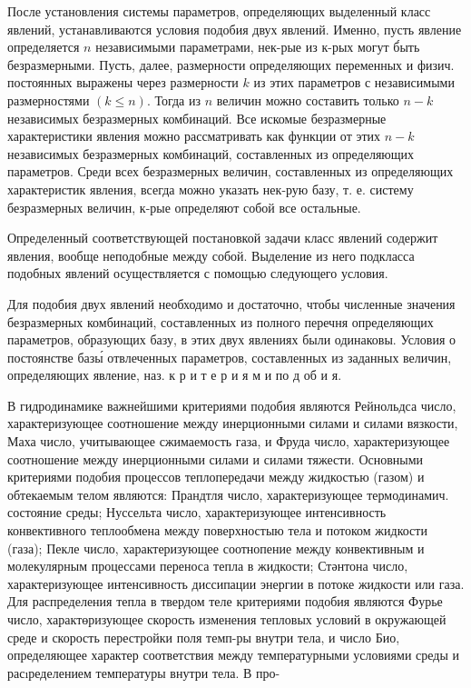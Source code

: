 \documentclass[10pt]{article}
\begin{document}
После установления системы параметров, определяющих выделенный класс явлений, устанавливаются условия подобия двух явлений. Именно, пусть явление определяется $n$ независимыми параметрами, нек-рые из к-рых могут б́ыть безразмерными. Пусть, далее, размерности определяющих переменных и физич. постоянных выражены через размерности $k$ из этих параметров с независимыми размерностями $(k \leqslant n)$. Тогда из $n$ величин можно составить только $n-k$ независимых безразмерных комбинаций. Все искомые безразмерные характеристики явления можно рассматривать как функции от этих $n-k$ независимых безразмерных комбинаций, составленных из определяющих параметров. Среди всех безразмерных величин, составленных из определяющих характеристик явления, всегда можно указать нек-рую базу, т. е. систему безразмерных величин, к-рые определяют собой все остальные.



Определенный соответствующей постановкой задачи класс явлений содержит явления, вообще неподобные между собой. Выделение из него подкласса подобных явлений осуществляется с помощью следующего условия.



Для подобия двух явлений необходимо и достаточно, чтобы численные значения безразмерных комбинаций, составленных из полного перечня определяющих параметров, образующих базу, в этих двух явлениях были одинаковы. Условия о постоянстве базы́ отвлеченных параметров, составленных из заданных величин, определяющих явление, наз. к р и т е р и я м и по д об и я.



В гидродинамике важнейшими критериями подобия являются Рейнольдса число, характеризующее соотношение между инерционными силами и силами вязкости, Маха число, учитывающее сжимаемость газа, и Фруда число, характеризующее соотношение между инерционными силами и силами тяжести. Основными критериями подобия процессов теплопередачи между жидкостью (газом) и обтекаемым телом являются: Прандтля число, характеризующее термодинамич. состояние среды; Нуссельта число, характеризующее интенсивность конвективного теплообмена между поверхностыю тела и потоком жидкости (газа); Пекле число, характеризующее соотнопение между конвективным и молекулярным процессами переноса тепла в жидкости; Стәнтона число, характеризующее интенсивность диссипации энергии в потоке жидкости или газа. Для распределения тепла в твердом теле критериями подобия являются Фурье число, характөризующее скорость изменения тепловых условий в окружающей среде и скорость перестройки поля темп-ры внутри тела, и число Био, определяющее характер соответствия между температурными условиями среды и расıределением температуры внутри тела. В про-
\end{document}
